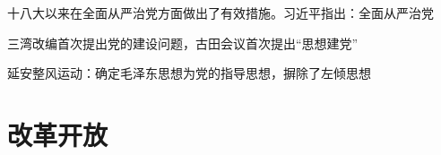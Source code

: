 \begin{notation}
    十八大以来在全面从严治党方面做出了有效措施。习近平指出：全面从严治党
\end{notation}
\begin{notation}
三湾改编首次提出党的建设问题，古田会议首次提出“思想建党”
\end{notation}
延安整风运动：确定毛泽东思想为党的指导思想，摒除了左倾思想
\section{改革开放}%
\label{sec:改革开放}

